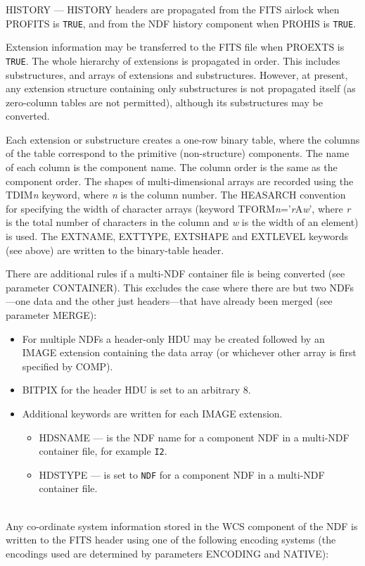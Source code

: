 \documentclass[twoside,11pt]{article}
\newcommand{\sstdiytopic}[2]{\goodbreak \item[{\hspace{-0.35em}#1\hspace{-0.35em}:}] \mbox{} \\[1.3ex] #2}
\newcommand{\ssthitemlist}[1]{
  \latexonly{
  \mbox{} \\
  \vspace{-3.5ex}
  }
  \begin{itemize}
     #1
  \end{itemize}
}
\newcommand{\sstitem}{\item}
\newcommand{\sstdiytopic}[2]{\\ \item[{#1}:]
      \begin{description}
         #2
      \end{description}
   }
\newcommand{\sstitem}{\item}
\begin{document}
{{{{            \sstitem
            HISTORY --- HISTORY headers are propagated from the FITS
              airlock when PROFITS is \texttt{TRUE}, and from the NDF
              history component when PROHIS is \texttt{TRUE}.

         }

         \sstitem
         Extension information may be transferred to the FITS file when
         PROEXTS is \texttt{TRUE}.
         The whole hierarchy of extensions is propagated
         in order.  This includes substructures, and arrays of extensions
         and substructures.  However, at present, any extension structure
         containing only substructures is not propagated itself (as
         zero-column tables are not permitted), although its
         substructures may be converted.
 
         Each extension or substructure creates a one-row binary table,
         where the columns of the table correspond to the primitive
         (non-structure) components.  The name of each column is the
         component name.  The column order is the same as the component
         order.  The shapes of multi-dimensional arrays are recorded using
         the TDIM\textit{n} keyword, where \textit{n} is the column number.
         The HEASARCH convention for specifying the width of character arrays 
         (keyword TFORM\textit{n}='\textit{r}A\textit{w}', where \textit{r} is
         the total number of characters in the column and \textit{w} is the 
         width of an element) is used.  The EXTNAME,
         EXTTYPE, EXTSHAPE and EXTLEVEL keywords (see above) are written
         to the binary-table header.

      }
      There are additional rules if a multi-NDF container file is being
      converted (see parameter CONTAINER).  This excludes the case where
      there are but two NDFs---one data and the other just 
      headers---that have already been merged (see parameter MERGE):
      \ssthitemlist{

         \sstitem
            For multiple NDFs a header-only HDU may be created followed 
            by an IMAGE extension containing the data array (or 
            whichever other array is first specified by COMP).
         \sstitem
            BITPIX for the header HDU is set to an arbitrary 8.
         \sstitem
            Additional keywords are written for each IMAGE extension.
         \ssthitemlist{
            \sstitem
             HDSNAME --- is the NDF name for a component NDF in a multi-NDF
               container file, for example \texttt{I2}.
             \sstitem
             HDSTYPE --- is set to \texttt{NDF} for a component NDF in a 
               multi-NDF container file.
         }
      }      
   }
   \sstdiytopic{
      \label{world_coordinate_systems}World Co-ordinate Systems
   }{
      Any co-ordinate system information stored in the WCS component of the
      NDF is written to the FITS header using one of the following encoding
      systems (the encodings used are determined by parameters ENCODING and 
      NATIVE):
      \ssthitemlist{

}}}
\end{document}
